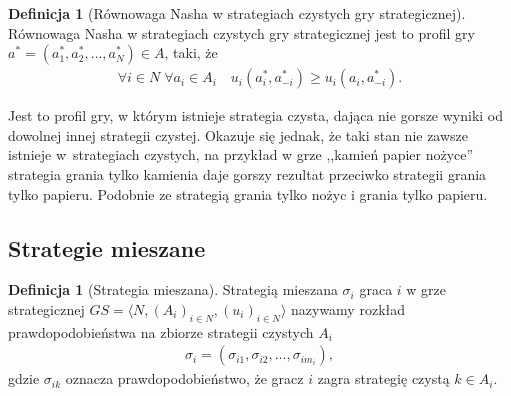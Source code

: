 \documentclass[inzynierska]{pwr_wmat_praca_dyplomowa}
\theoremstyle{plain}
\numberwithin{theorem}{chapter}
\theoremstyle{definition}
\numberwithin{theorem}{chapter}
\newtheorem{definition}[theorem]{Definicja}
\begin{document}
	\begin{definition}[Równowaga Nasha w strategiach czystych gry strategicznej]
		Równowaga Nasha w strategiach czystych gry strategicznej jest to profil gry $a^*= (a_1^*, a_2^*, \dots, a_N^*)\in A$, taki, że
		\begin{align*}
			\mathop{\forall}{i \in N}\;
			\mathop{\forall}{a_i \in A_i} \quad
			u_i(a_i^*, a_{-i}^*) \ge u_i(a_i, a_{-i}^*).
		\end{align*}
	\end{definition}
	\noindent
	Jest to profil gry, w którym istnieje strategia czysta, dająca nie gorsze wyniki od dowolnej innej strategii czystej.
	Okazuje się jednak, że taki stan nie zawsze istnieje w~strategiach czystych, na przykład w grze ,,kamień papier nożyce'' strategia grania tylko kamienia daje gorszy rezultat przeciwko strategii grania tylko papieru. Podobnie ze strategią grania tylko nożyc i grania tylko papieru.
	\subsection{Strategie mieszane}
	\begin{definition}[Strategia mieszana]
		Strategią mieszana $\sigma_i$ graca $i$ w grze strategicznej $GS = \langle N, (A_i)_{i \in N}, (u_i)_{i \in N} \rangle $ nazywamy rozkład prawdopodobieństwa na zbiorze strategii czystych $A_i$
		\begin{align*}
			\sigma_i = (\sigma_{i1},  \sigma_{i2}, \dots, \sigma_{im_i}),
		\end{align*}
	gdzie $\sigma_{ik}$ oznacza prawdopodobieństwo, że gracz $i$ zagra strategię czystą $k\in A_i$.  
	\end{definition}
\end{document}
